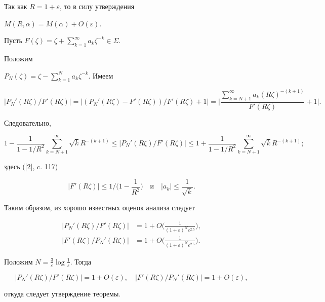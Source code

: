 \begin{pf} Так как $R= 1+\varepsilon$, то в силу утверждения\;


$M(R,\alpha)=M(\alpha)+O(\varepsilon)$.


Пусть $F(\zeta)=\zeta+ \sum\limits_{k=1}^{\infty}a_k\zeta^{-k}\in\Sigma.$





Положим


$P_N(\zeta) = \zeta - \sum\limits_{k=1}^{N}a_k\zeta^{-k} $. Имеем


$$


|P_N'(R\zeta)/F'(R\zeta)|=


|(P_N'(R\zeta)- F'(R\zeta))/F'(R\zeta)+1|=


\bigg|\frac{\sum\limits_{k=N+1}^{\infty}a_k(R\zeta)^{-(k+1)}}


{F'(R\zeta)}+1\bigg|.


$$


Следовательно,


$$


1-\frac{1}{1-1/R^2}\sum_{k=N+1}^{\infty}


\sqrt{k}R^{-(k+1)} \leq


|P_N'(R\zeta)/F'(R\zeta)| \leq


1+\frac{1}{1-1/R^2}\sum_{k=N+1}^{\infty}


\sqrt{k}R^{-(k+1)};


$$


здесь ([2], c. 117)


$$


|F'(R\zeta)| \leq 1/\bigg(1-\frac{1}{R^2}\bigg)


\quad \text{и} \quad |a_k| \leq \frac{1}{\sqrt{k}}.


$$





Таким образом, из хорошо известных оценок анализа следует


\begin{align*}


|P_N'(R\zeta)/F'(R\zeta)|&=


1+O\bigg(\frac{1}{(1+\varepsilon)^N \varepsilon^{2.5}}\bigg),\\


%


|F'(R\zeta)/P_N'(R\zeta)|&=


1+O\bigg(\frac{1}{(1+\varepsilon)^N \varepsilon^{2.5}}\bigg).


\end{align*}


Положим $N = \frac{3}{\varepsilon}\log\frac{1}{\varepsilon}$. Тогда


$$


|P_N'(R\zeta)/F'(R\zeta)|= 1+O(\varepsilon), \quad


|F'(R\zeta)/P_N'(R\zeta)|= 1+O(\varepsilon),


$$


откуда следует утверждение теоремы.


\end{pf}





